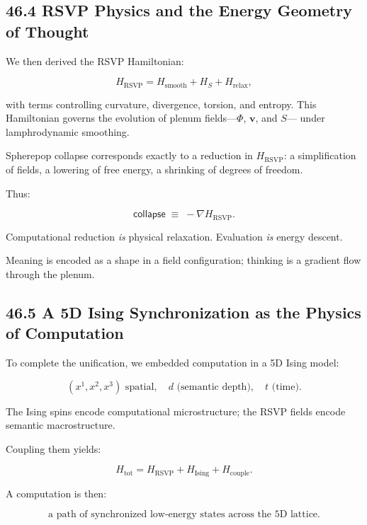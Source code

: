 \documentclass[12pt,letterpaper]{article}
\theoremstyle{remark}
\begin{document}
\subsection{46.4 RSVP Physics and the Energy Geometry of Thought}

We then derived the RSVP Hamiltonian:

\[
H_{\text{RSVP}}
= H_{\text{smooth}}
+ H_S
+ H_{\text{relax}},
\]

with terms controlling curvature, divergence, torsion, and entropy.  
This Hamiltonian governs the evolution of plenum fields—$\Phi$, $\mathbf{v}$, and $S$—
under lamphrodynamic smoothing.

Spherepop collapse corresponds exactly to a reduction in $H_{\text{RSVP}}$:
a simplification of fields,
a lowering of free energy,
a shrinking of degrees of freedom.

Thus:

\[
\mathsf{collapse}
\;\equiv\;
-\nabla H_{\text{RSVP}}.
\]

Computational reduction \emph{is} physical relaxation.  
Evaluation \emph{is} energy descent.

Meaning is encoded as a shape in a field configuration;
thinking is a gradient flow through the plenum.

\subsection{46.5 A 5D Ising Synchronization as the Physics of Computation}

To complete the unification, we embedded computation in a 5D Ising model:

\[
(x^1, x^2, x^3) \text{ spatial},\quad 
d \text{ (semantic depth)},\quad
t \text{ (time)}.
\]

The Ising spins encode computational microstructure;
the RSVP fields encode semantic macrostructure.

Coupling them yields:

\[
H_{\text{tot}} = 
H_{\text{RSVP}}
+ H_{\text{Ising}}
+ H_{\text{couple}}.
\]

A computation is then:

\[
\boxed{
\text{a path of synchronized low-energy states across the 5D lattice}.
}
\]
\end{document}
